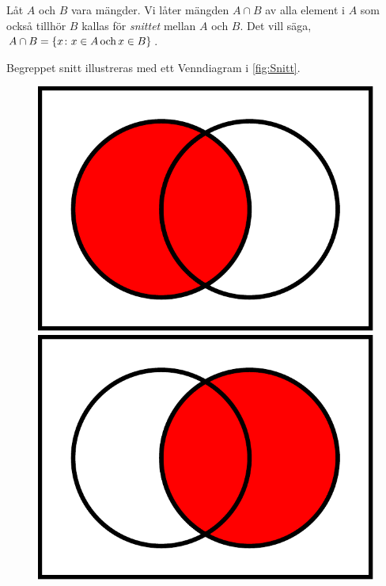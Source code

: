 \begin{definition}\label{def:Snitt}
  Låt \(A\) och \(B\) vara mängder.
  Vi låter mängden \(A\cap B\) av alla element i \(A\) som också tillhör
  \(B\) kallas för \emph{snittet} mellan \(A\) och \(B\).
  Det vill säga, \(A\cap B = \{x\colon x\in A\operatorname{och} x\in B\}\).
\end{definition}
Begreppet snitt illustreras med ett Venndiagram i \cref{fig:Snitt}.
\begin{figure}
  \begin{minipage}{0.3\textwidth}
    \includegraphics[width=\textwidth]{figs/A.pdf}
  \end{minipage}
  \hfill
  \begin{minipage}{0.3\textwidth}
    \includegraphics[width=\textwidth]{figs/B.pdf}

\end{minipage}
\end{figure}
